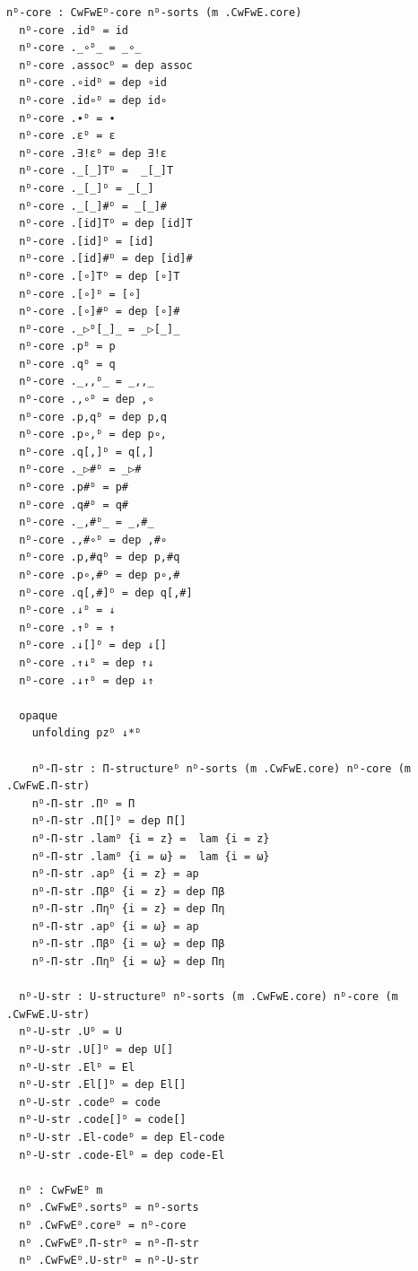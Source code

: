 \documentclass[10pt,a4paper]{article}
\theoremstyle{definition}
\theoremstyle{remark}
\begin{document}
{\begin{Verbatim}[breaklines=true,breakanywhere=true,fontsize=\scriptsize]
  nᴰ-core : CwFwEᴰ-core nᴰ-sorts (m .CwFwE.core)
  nᴰ-core .idᴰ = id
  nᴰ-core ._∘ᴰ_ = _∘_
  nᴰ-core .assocᴰ = dep assoc
  nᴰ-core .∘idᴰ = dep ∘id
  nᴰ-core .id∘ᴰ = dep id∘
  nᴰ-core .∙ᴰ = ∙
  nᴰ-core .εᴰ = ε
  nᴰ-core .∃!εᴰ = dep ∃!ε
  nᴰ-core ._[_]Tᴰ =  _[_]T
  nᴰ-core ._[_]ᴰ = _[_]
  nᴰ-core ._[_]#ᴰ = _[_]#
  nᴰ-core .[id]Tᴰ = dep [id]T
  nᴰ-core .[id]ᴰ = [id]
  nᴰ-core .[id]#ᴰ = dep [id]#
  nᴰ-core .[∘]Tᴰ = dep [∘]T
  nᴰ-core .[∘]ᴰ = [∘]
  nᴰ-core .[∘]#ᴰ = dep [∘]#
  nᴰ-core ._▷ᴰ[_]_ = _▷[_]_
  nᴰ-core .pᴰ = p
  nᴰ-core .qᴰ = q
  nᴰ-core ._,,ᴰ_ = _,,_
  nᴰ-core .,∘ᴰ = dep ,∘
  nᴰ-core .p,qᴰ = dep p,q
  nᴰ-core .p∘,ᴰ = dep p∘,
  nᴰ-core .q[,]ᴰ = q[,]
  nᴰ-core ._▷#ᴰ = _▷#
  nᴰ-core .p#ᴰ = p#
  nᴰ-core .q#ᴰ = q#
  nᴰ-core ._,#ᴰ_ = _,#_
  nᴰ-core .,#∘ᴰ = dep ,#∘
  nᴰ-core .p,#qᴰ = dep p,#q
  nᴰ-core .p∘,#ᴰ = dep p∘,#
  nᴰ-core .q[,#]ᴰ = dep q[,#]
  nᴰ-core .↓ᴰ = ↓
  nᴰ-core .↑ᴰ = ↑
  nᴰ-core .↓[]ᴰ = dep ↓[]
  nᴰ-core .↑↓ᴰ = dep ↑↓
  nᴰ-core .↓↑ᴰ = dep ↓↑

  opaque
    unfolding pzᴰ ↓*ᴰ

    nᴰ-Π-str : Π-structureᴰ nᴰ-sorts (m .CwFwE.core) nᴰ-core (m .CwFwE.Π-str)
    nᴰ-Π-str .Πᴰ = Π
    nᴰ-Π-str .Π[]ᴰ = dep Π[]
    nᴰ-Π-str .lamᴰ {i = z} =  lam {i = z} 
    nᴰ-Π-str .lamᴰ {i = ω} =  lam {i = ω} 
    nᴰ-Π-str .apᴰ {i = z} = ap
    nᴰ-Π-str .Πβᴰ {i = z} = dep Πβ
    nᴰ-Π-str .Πηᴰ {i = z} = dep Πη
    nᴰ-Π-str .apᴰ {i = ω} = ap
    nᴰ-Π-str .Πβᴰ {i = ω} = dep Πβ
    nᴰ-Π-str .Πηᴰ {i = ω} = dep Πη

  nᴰ-U-str : U-structureᴰ nᴰ-sorts (m .CwFwE.core) nᴰ-core (m .CwFwE.U-str)
  nᴰ-U-str .Uᴰ = U
  nᴰ-U-str .U[]ᴰ = dep U[]
  nᴰ-U-str .Elᴰ = El
  nᴰ-U-str .El[]ᴰ = dep El[]
  nᴰ-U-str .codeᴰ = code
  nᴰ-U-str .code[]ᴰ = code[]
  nᴰ-U-str .El-codeᴰ = dep El-code
  nᴰ-U-str .code-Elᴰ = dep code-El

  nᴰ : CwFwEᴰ m
  nᴰ .CwFwEᴰ.sortsᴰ = nᴰ-sorts
  nᴰ .CwFwEᴰ.coreᴰ = nᴰ-core
  nᴰ .CwFwEᴰ.Π-strᴰ = nᴰ-Π-str 
  nᴰ .CwFwEᴰ.U-strᴰ = nᴰ-U-str


\end{Verbatim}
}
\end{document}
